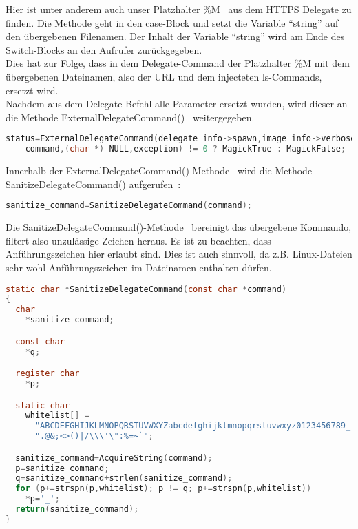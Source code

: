 Hier ist unter anderem auch unser Platzhalter \%M~\cite{caseM} aus dem HTTPS Delegate zu finden.
Die Methode geht in den case-Block und setzt die Variable "`string"' auf den übergebenen Filenamen.
Der Inhalt der Variable "`string"' wird am Ende des Switch-Blocks an den Aufrufer zurückgegeben.\\

Dies hat zur Folge, dass in dem Delegate-Command der Platzhalter \%M mit dem übergebenen Dateinamen,
also der URL und dem injecteten ls-Commands, ersetzt wird.\\

Nachdem aus dem Delegate-Befehl alle Parameter ersetzt wurden, wird dieser an die Methode ExternalDelegateCommand()~\cite{CallExternalDelegateCommand} weitergegeben.

\begin{lstlisting}[firstnumber=1301, language=C, caption=magick/delegate.c Aufruf ExternalDelegateCommand(),label={lst:lstlisting}]
  status=ExternalDelegateCommand(delegate_info->spawn,image_info->verbose,
    command,(char *) NULL,exception) != 0 ? MagickTrue : MagickFalse;
\end{lstlisting}
\vspace{5mm}

Innerhalb der ExternalDelegateCommand()-Methode~\cite{DeklarationExternalDelegateCommand} wird die Methode SanitizeDelegateCommand() aufgerufen~\cite{CallSanatizeDelegateCommand}:\\

\begin{lstlisting}[firstnumber=395, language=C, caption=magick/delegate.c Aufruf SanitizeDelegateCommand(),label={lst:lstlisting}]
  sanitize_command=SanitizeDelegateCommand(command);
\end{lstlisting}
\vspace{5mm}

\newpage

Die SanitizeDelegateCommand()-Methode~\cite{DeclareSanatizeDelegateCommand} bereinigt das übergebene Kommando, filtert also unzulässige Zeichen heraus.
Es ist zu beachten, dass Anführungszeichen hier erlaubt sind.
Dies ist auch sinnvoll, da z.B. Linux-Dateien sehr wohl Anführungszeichen im Dateinamen enthalten dürfen.\\

\begin{lstlisting}[firstnumber=322, language=C, caption=magick/delegate.c SanitizieDelegateCommand(),label={lst:lstlisting}]
static char *SanitizeDelegateCommand(const char *command)
{
  char
    *sanitize_command;

  const char
    *q;

  register char
    *p;

  static char
    whitelist[] =
      "ABCDEFGHIJKLMNOPQRSTUVWXYZabcdefghijklmnopqrstuvwxyz0123456789_- "
      ".@&;<>()|/\\\'\":%=~`";

  sanitize_command=AcquireString(command);
  p=sanitize_command;
  q=sanitize_command+strlen(sanitize_command);
  for (p+=strspn(p,whitelist); p != q; p+=strspn(p,whitelist))
    *p='_';
  return(sanitize_command);
}
\end{lstlisting}
\vspace{5mm}

